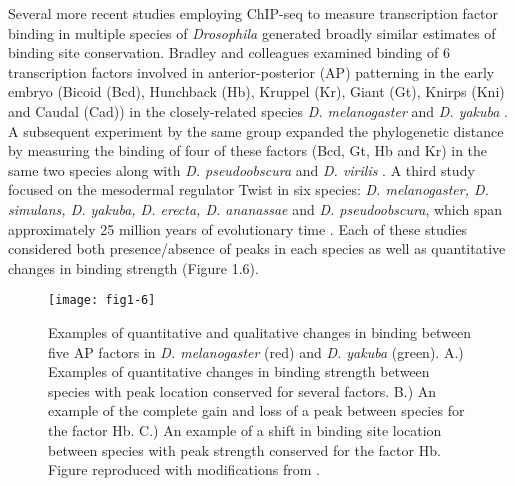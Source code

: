 Several more recent studies employing ChIP-seq to measure transcription factor binding in multiple species of \emph{Drosophila} generated broadly similar estimates of binding site conservation. Bradley and colleagues examined binding of 6 transcription factors involved in anterior-posterior (AP) patterning in the early embryo (Bicoid (Bcd), Hunchback (Hb), Kruppel (Kr), Giant (Gt), Knirps (Kni) and Caudal (Cad)) in the closely-related species \emph{D. melanogaster} and \emph{D. yakuba} \citep{bradley_binding_2010}. A subsequent experiment by the same group expanded the phylogenetic distance by measuring the binding of four of these factors (Bcd, Gt, Hb and Kr) in the same two species along with \emph{D. pseudoobscura} and \emph{D. virilis} \citep{paris_extensive_2013}. A third study focused on the mesodermal regulator Twist in six species: \emph{D. melanogaster, D. simulans, D. yakuba, D. erecta, D. ananassae} and \emph{D. pseudoobscura}, which span approximately 25 million years of evolutionary time \citep{he_high_2011}. Each of these studies considered both presence/absence of peaks in each species as well as quantitative changes in binding strength (Figure 1.6).

\begin{figure}
\centering
\texttt{[image: fig1-6]}
\caption[Examples of quantitative and qualitative changes in binding between five AP factors in \emph{D. melanogaster} and \emph{D. yakuba}]{Examples of quantitative and qualitative changes in binding between five AP factors in \emph{D. melanogaster} (red) and \emph{D. yakuba} (green). A.) Examples of quantitative changes in binding strength between species with peak location conserved for several factors. B.) An example of the complete gain and loss of a peak between species for the factor Hb. C.) An example of a shift in binding site location between species with peak strength conserved for the factor Hb. Figure reproduced with modifications from \citet{bradley_binding_2010}.}
\label{Figure 1.6}
\end{figure}

